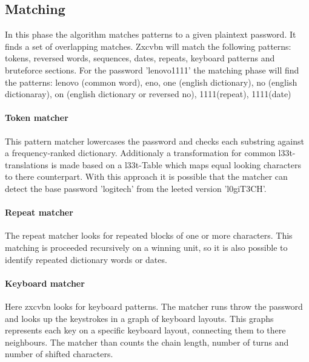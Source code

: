 \documentclass[12pt,a4paper]{article}
\begin{document}

\subsection{Matching}
In this phase the algorithm matches patterns to a given plaintext password. 
It finds a set of overlapping matches. Zxcvbn will match the following patterns: tokens, reversed words, sequences, dates, repeats, keyboard patterns and bruteforce sections. For the password 'lenovo1111' the matching phase will find the patterns: lenovo (common word), eno, one (english dictionary), no (english dictionaray), on (english dictionary or reversed no), 1111(repeat), 1111(date)


\paragraph{Token matcher} 

This pattern matcher lowercases the password and checks each substring against a frequency-ranked dictionary. 
Additionaly a transformation for common l33t-translations is made based on a l33t-Table which maps equal looking characters to there counterpart.
With this approach it is possible that the matcher can detect the base password 'logitech' from the leeted version 'l0giT3CH'.

\paragraph{Repeat matcher}
The repeat matcher looks for repeated blocks of one or more characters.
This matching is proceeded recursively on a winning unit, so it is also possible to identify repeated dictionary words or dates.


\paragraph{Keyboard matcher}
Here zxcvbn looks for keyboard patterns. The matcher runs throw the password and looks up the keystrokes in a graph of keyboard layouts. This graphs represents each key on a specific keyboard layout, connecting them to there neighbours. The matcher than counts the chain length, number of turns and number of shifted characters.
\end{document}
